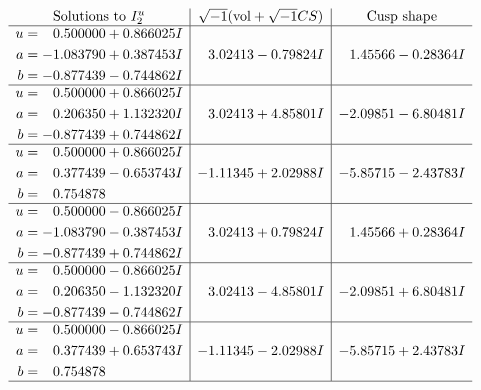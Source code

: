 \documentclass[1p]{elsarticle_modified}
\theoremstyle{definition}
\newcommand{\I}{\sqrt{-1}}
\begin{document}
$$\begin{array}{c|c|c}  
\text{Solutions to }I^u_{2}& \I (\text{vol} + \sqrt{-1}CS) & \text{Cusp shape}\\
 \hline 
\begin{aligned}
u &= \phantom{-}0.500000 + 0.866025 I \\
a &= -1.083790 + 0.387453 I \\
b &= -0.877439 - 0.744862 I\end{aligned}
 & \phantom{-}3.02413 - 0.79824 I & \phantom{-}1.45566 - 0.28364 I \\ \hline\begin{aligned}
u &= \phantom{-}0.500000 + 0.866025 I \\
a &= \phantom{-}0.206350 + 1.132320 I \\
b &= -0.877439 + 0.744862 I\end{aligned}
 & \phantom{-}3.02413 + 4.85801 I & -2.09851 - 6.80481 I \\ \hline\begin{aligned}
u &= \phantom{-}0.500000 + 0.866025 I \\
a &= \phantom{-}0.377439 - 0.653743 I \\
b &= \phantom{-}0.754878\phantom{ +0.000000I}\end{aligned}
 & -1.11345 + 2.02988 I & -5.85715 - 2.43783 I \\ \hline\begin{aligned}
u &= \phantom{-}0.500000 - 0.866025 I \\
a &= -1.083790 - 0.387453 I \\
b &= -0.877439 + 0.744862 I\end{aligned}
 & \phantom{-}3.02413 + 0.79824 I & \phantom{-}1.45566 + 0.28364 I \\ \hline\begin{aligned}
u &= \phantom{-}0.500000 - 0.866025 I \\
a &= \phantom{-}0.206350 - 1.132320 I \\
b &= -0.877439 - 0.744862 I\end{aligned}
 & \phantom{-}3.02413 - 4.85801 I & -2.09851 + 6.80481 I \\ \hline\begin{aligned}
u &= \phantom{-}0.500000 - 0.866025 I \\
a &= \phantom{-}0.377439 + 0.653743 I \\
b &= \phantom{-}0.754878\phantom{ +0.000000I}\end{aligned}
 & -1.11345 - 2.02988 I & -5.85715 + 2.43783 I\\
 \hline 
 \end{array}$$\newpage
\end{document}

